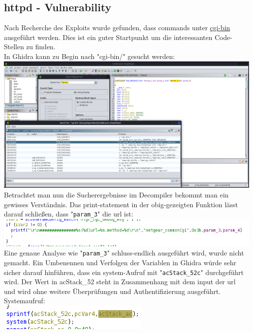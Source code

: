 \documentclass{article}
\begin{document}
	\subsection*{httpd - Vulnerability}
	Nach Recherche des Exploits wurde gefunden, dass commands unter \href{https://www.kb.cert.org/vuls/id/582384}{cgi-bin} ausgeführt werden. Dies ist ein guter Startpunkt um die interessanten Code-Stellen zu finden.\\
	In Ghidra kann zu Begin nach "cgi-bin/" gesucht werden:\\
	\includegraphics[width=1\linewidth]{"pictures/2.1 ghidra search"}\\
	Betrachtet man nun die Sucherergebnisse im Decompiler bekommt man ein gewisses Verständnis. Das print-statement in der obig-gezeigten Funktion lässt darauf schließen, dass "\texttt{param\_3}" die url ist:\\
	\includegraphics[width=0.7\linewidth]{"pictures/2.2 ghidra printf"}\\
	Eine genaue Analyse wie "\texttt{param\_3}" schluss-endlich ausgeführt wird, wurde nicht gemacht. Ein Umbenennen und Verfolgen der Variablen in Ghidra würde sehr sicher darauf hinführen, dass ein system-Aufruf mit "\texttt{acStack\_52c}" durchgeführt wird. Der Wert in acStack\_52 steht in Zusammenhang mit dem input der url und wird ohne weitere Überprüfungen und Authentifizierung ausgeführt.\\
	Systemaufruf:\\
	\includegraphics[width=0.7\linewidth]{"pictures/2.2 ghidra system"}\\
\end{document}
